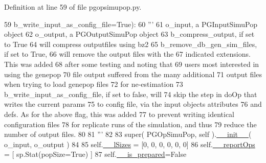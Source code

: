 Definition at line 59 of file pgopsimupop.\+py.


\begin{DoxyCode}
59                                     b\_write\_input\_as\_config\_file=\textcolor{keyword}{True}):  
60         \textcolor{stringliteral}{'''}
61 \textcolor{stringliteral}{            o\_input, a PGInputSimuPop object}
62 \textcolor{stringliteral}{            o\_output, a PGOutputSimuPop object}
63 \textcolor{stringliteral}{            b\_compress\_output, if set to True}
64 \textcolor{stringliteral}{                will compress outputfiles using bz2}
65 \textcolor{stringliteral}{            b\_remove\_db\_gen\_sim\_files, if set to True,}
66 \textcolor{stringliteral}{                will remove the output files with the}
67 \textcolor{stringliteral}{                indicated extensions.  This was added}
68 \textcolor{stringliteral}{                after some testing and noting that}
69 \textcolor{stringliteral}{                users most interested in using the genepop}
70 \textcolor{stringliteral}{                file output suffered from the many additional}
71 \textcolor{stringliteral}{                output files when trying to load genepop files}
72 \textcolor{stringliteral}{                for ne-estimation}
73 \textcolor{stringliteral}{            b\_write\_input\_as\_config\_file, if set to false, will }
74 \textcolor{stringliteral}{                skip the step in doOp that writes the current params}
75 \textcolor{stringliteral}{                to config file, via the input objects attributes }
76 \textcolor{stringliteral}{                and defs. As for the above flag, this was added}
77 \textcolor{stringliteral}{                to prevent writing identical configuration files}
78 \textcolor{stringliteral}{                for replicate runs of the simulation, and thus}
79 \textcolor{stringliteral}{                reduce the number of output files. }
80 \textcolor{stringliteral}{}
81 \textcolor{stringliteral}{        '''}
82 
83         super( PGOpSimuPop, self ).\hyperlink{classnegui_1_1pgopsimupop_1_1PGOpSimuPop_a6548b8996f7ace76266e629d9ff8c11e}{\_\_init\_\_}( o\_input, o\_output )
84 
85         self.\hyperlink{classnegui_1_1pgopsimupop_1_1PGOpSimuPop_a1061b53dea80371a6414760b43b2cd1e}{\_\_lSizes} = [0, 0, 0, 0, 0, 0]
86         self.\hyperlink{classnegui_1_1pgopsimupop_1_1PGOpSimuPop_a1224d81cfdf1400b2f12970074c81817}{\_\_reportOps} = [ sp.Stat(popSize=\textcolor{keyword}{True}) ]
87         self.\hyperlink{classnegui_1_1pgopsimupop_1_1PGOpSimuPop_ac10f21f990f51e85c7fab2b5aa888edd}{\_\_is\_prepared}=\textcolor{keyword}{False}

\end{DoxyCode}
